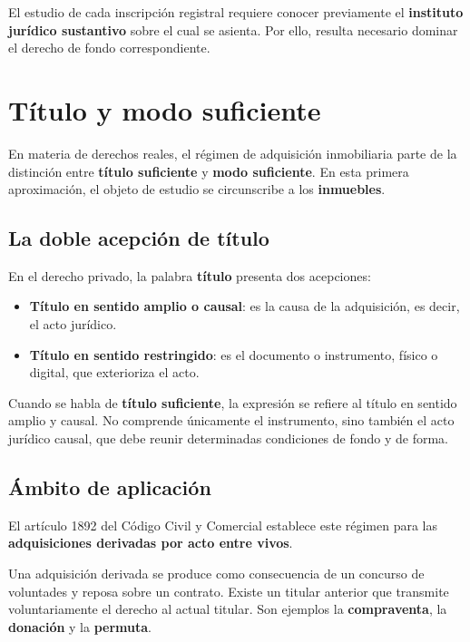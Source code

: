 \documentclass[12pt,oneside]{book}
\begin{document}
El estudio de cada inscripción registral requiere conocer previamente el \textbf{instituto jurídico sustantivo} sobre el cual se asienta. Por ello, resulta necesario dominar el derecho de fondo correspondiente.

\section{Título y modo suficiente}

En materia de derechos reales, el régimen de adquisición inmobiliaria parte de la distinción entre \textbf{título suficiente} y \textbf{modo suficiente}. En esta primera aproximación, el objeto de estudio se circunscribe a los \textbf{inmuebles}.

\subsection{La doble acepción de título}

En el derecho privado, la palabra \textbf{título} presenta dos acepciones:

\begin{itemize}
    \item \textbf{Título en sentido amplio o causal}: es la causa de la adquisición, es decir, el acto jurídico.
    \item \textbf{Título en sentido restringido}: es el documento o instrumento, físico o digital, que exterioriza el acto.
\end{itemize}

Cuando se habla de \textbf{título suficiente}, la expresión se refiere al título en sentido amplio y causal. No comprende únicamente el instrumento, sino también el acto jurídico causal, que debe reunir determinadas condiciones de fondo y de forma.

\subsection{Ámbito de aplicación}

El artículo 1892 del Código Civil y Comercial establece este régimen para las \textbf{adquisiciones derivadas por acto entre vivos}.

Una adquisición derivada se produce como consecuencia de un concurso de voluntades y reposa sobre un contrato. Existe un titular anterior que transmite voluntariamente el derecho al actual titular. Son ejemplos la \textbf{compraventa}, la \textbf{donación} y la \textbf{permuta}.
\end{document}
